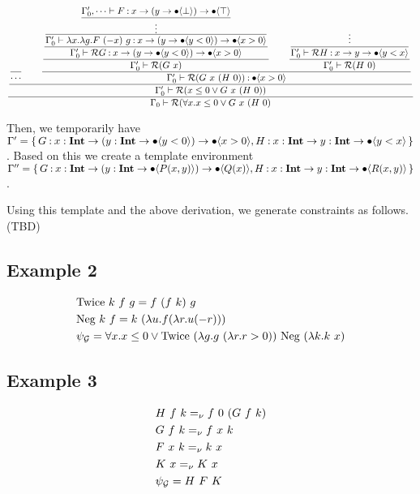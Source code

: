 \documentclass[acmsmall,review,anonymous]{acmart}\settopmatter{printfolios=true,printccs=false,printacmref=false}
\begin{document}
\begin{align*}
\dfrac{
\dfrac{
\dfrac{}{
\cdots
}
\qquad
\dfrac{
\dfrac{
\dfrac{
\dfrac{
\dfrac{\Gamma_0', \cdots \vdash F \mathbin{:} x \to (y \to \bullet \langle \bot \rangle) \to \bullet \langle \top \rangle }{\vdots}}
{
\Gamma_0' \vdash \lambda x. \lambda g. F\ (-x)\ g \mathbin{:} x\to(y\to\bullet \langle y<0 \rangle)\to\bullet \langle x > 0 \rangle
}
}{
\Gamma_0' \vdash \mathcal{R} G \mathbin{:} x\to(y\to\bullet \langle y<0 \rangle)\to\bullet \langle x > 0 \rangle
}
}{
\Gamma_0' \vdash \mathcal{R} (G\ x)
}
\qquad
\dfrac{
\dfrac{
\vdots
}{
\Gamma_0' \vdash \mathcal{R} H \mathbin{:} x \to y \to \bullet \langle y < x \rangle
}
}{
\Gamma_0' \vdash \mathcal{R} (H\ 0)
}
}{
\Gamma_0' \vdash \mathcal{R} (G\ x\ (H\ 0)) \mathbin{:} \bullet \langle x > 0 \rangle
}
}{
\Gamma_0' \vdash \mathcal{R} (x \leq 0 \lor G\ x\ (H\ 0))
}
}{
\Gamma_0 \vdash \mathcal{R} (\forall x. x \leq 0 \lor G\ x\ (H\ 0)
}
\end{align*}

Then, we temporarily have \( \Gamma' = \{\, G \mathbin{:} {x} : \textbf{Int} \to ({y} : \textbf{Int} \to \bullet \langle y < 0 \rangle) \to \bullet \langle x > 0 \rangle, H \mathbin{:} {x} : \textbf{Int} \to {y} : \textbf{Int} \to \bullet \langle y < x \rangle \, \} \).
Based on this we create a template environment \( \Gamma'' = \{\, G \mathbin{:} {x} : \textbf{Int} \to ({y} : \textbf{Int} \to \bullet \langle P(x, y) \rangle) \to \bullet \langle Q(x) \rangle, H \mathbin{:} {x} : \textbf{Int} \to {y} : \textbf{Int} \to \bullet \langle R(x, y) \rangle \, \} \).

Using this template and the above derivation, we generate constraints as follows. (TBD)



\subsection{Example 2}

\begin{align*}
  &\text{Twice}\ k\ f\ g = f\ (f\ k)\ g\\
  &\text{Neg}\ k\ f = k\ (\lambda u. f (\lambda r. u (-r))) \\
  &\psi_{\mathcal{G}} = \forall x. x \leq 0 \lor \text{Twice}\ (\lambda g. g\ (\lambda r. r > 0))\ \text{Neg}\ (\lambda k. k\ x)
\end{align*}

\subsection{Example 3}

\begin{align*}
    &H\ f\ k =_{\nu} f\ 0\ (G\ f\ k) \\
    &G\ f\ k =_{\nu} f\ x\ k \\
    &F\ x\ k =_{\nu} k\ x \\
    &K\ x =_{\nu} K\ x \\
    &\psi_{\mathcal{G}} = H\ F\ K
\end{align*}
\end{document}
